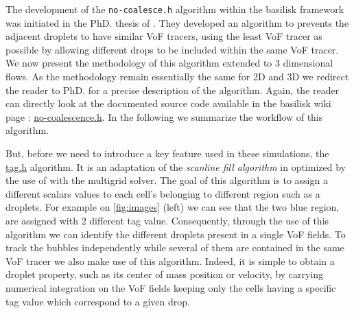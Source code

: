The development of the \texttt{no-coalesce.h} algorithm within the basilisk framework was initiated in the PhD. thesis of \citet{mani2021numerical}.
They developed an algorithm to prevents the adjacent droplets to have similar VoF tracers, using the least VoF tracer as possible by allowing different drops to be included within the same VoF tracer.
We now present the methodology of this algorithm extended to 3 dimensional flows.
As the methodology remain essentially the same for 2D and 3D we redirect the reader to \citet{mani2021numerical} PhD. for a precise description of the algorithm. 
Again, the reader can directly look at the documented source code available in the basilisk wiki page : \href{http://basilisk.fr/sandbox/fintzin/Rising-Suspenion/no-coalescence.h}{no-coalescence.h}.
In the following we summarize the workflow of this algorithm. 

But, before we need to introduce a key feature used in these simulations, the \href{http://basilisk.fr/src/tag.h}{tag.h} algorithm. 
It is an adaptation of the \textit{scanline fill algorithm} in optimized by the use of with the multigrid solver. 
The goal of this algorithm is to assign a different scalars values to each cell's belonging to different region such as a droplets. 
For example on \ref{fig:images} (left) we can see that the two blue region, are assigned with 2 different tag value. 
Consequently, through the use of this algorithm we can identify the different droplets present in a single VoF fields. 
To track the bubbles independently while several of them are contained in the same VoF tracer we also make use of this algorithm.   
Indeed, it is simple to obtain a droplet property, such as its center of mass position or velocity, by carrying numerical integration on the VoF fields keeping only the cells having a specific tag value which correspond to a given drop.  



